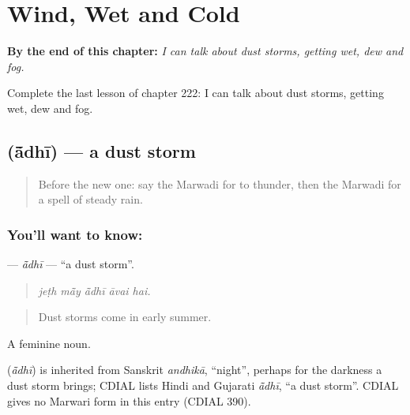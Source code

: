 
\chapter{Wind, Wet and Cold}
\label{ch:mw-wind-wet-and-cold}

\begin{chapteropening}
\textbf{By the end of this chapter:} \emph{I can talk about dust storms, getting wet, dew and fog.}

Complete the last lesson of chapter 222: I can talk about dust storms, getting wet, dew and fog.
\end{chapteropening}

\section[\texorpdfstring{\mw{आंधी} (ā̃dhī)}{आंधी (ā̃dhī)}]{ (ā̃dhī) — a dust storm}

\label{lesson:MW-C222-adhi}



\begin{quote}
Before the new one: say the Marwadi for to thunder, then the Marwadi for a spell of steady rain.
\end{quote}

\subsection*{You'll want to know: }
\textbf{} — \emph{ā̃dhī} — \textquotedblleft{}a dust storm\textquotedblright{}.

\begin{quote}
    
\end{quote}

\begin{quote}
\emph{jeṭh mā̃y ā̃dhī āvai hai.}
\end{quote}

\begin{quote}
Dust storms come in early summer.
\end{quote}

A feminine noun.

\begin{cousinweb}
\textbf{} (\emph{ā̃dhī}) is inherited from Sanskrit \emph{andhikā}, \textquotedblleft{}night\textquotedblright{}, perhaps for the darkness a dust storm brings; CDIAL lists Hindi and Gujarati \emph{ā̃dhī}, \textquotedblleft{}a dust storm\textquotedblright{}. CDIAL gives no Marwari form in this entry (CDIAL 390).
\end{cousinweb}

